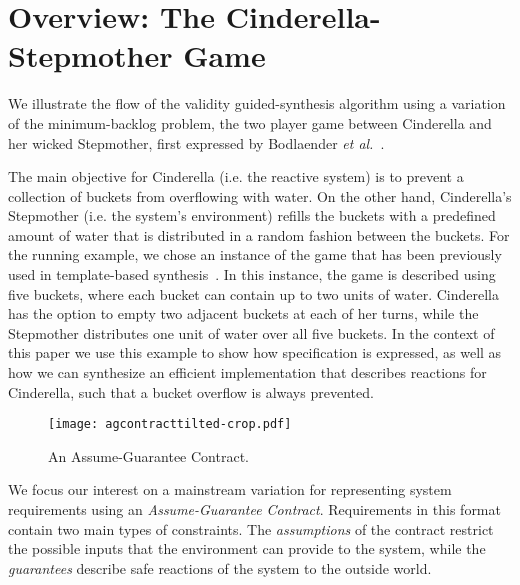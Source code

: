 \section{Overview: The Cinderella-Stepmother Game}
\label{sec:example}

We illustrate the flow of the validity guided-synthesis algorithm using a variation of the minimum-backlog
problem, the two player game between Cinderella and her wicked Stepmother, first expressed by Bodlaender \textit{et al.}~\cite{bodlaender2012cinderella}.

The main objective for Cinderella (i.e. the reactive system) is to prevent a
collection of buckets from overflowing with water. On the other hand,
Cinderella's Stepmother (i.e. the system's environment) refills the buckets with a predefined amount of water that is distributed in a random fashion between the buckets.
For the running example, we chose an instance of the game that has been
previously used in template-based synthesis~\cite{beyene2014constraint}. In this instance, the game is described
using five buckets, where each bucket can contain up to two units of water.
Cinderella has the option to empty two adjacent buckets at each of her turns,
while the Stepmother distributes one unit of water over all five buckets. In the context of this paper we use this example to show how specification is expressed, as well as how we can synthesize an efficient implementation that describes reactions for Cinderella, such that a bucket overflow is always prevented.

\begin{figure}[!t]
\centering
\texttt{[image: agcontracttilted-crop.pdf]}
\caption{An Assume-Guarantee Contract.}
\label{fg:agcontract}
\end{figure}

We focus our interest on a mainstream variation for representing system requirements using an \textit{Assume-Guarantee
Contract}. Requirements in this format contain two main types of constraints.
The \emph{assumptions} of the contract restrict the possible inputs that the
environment can provide to the system, while the \emph{guarantees} 
describe safe reactions of the system to the outside world.

